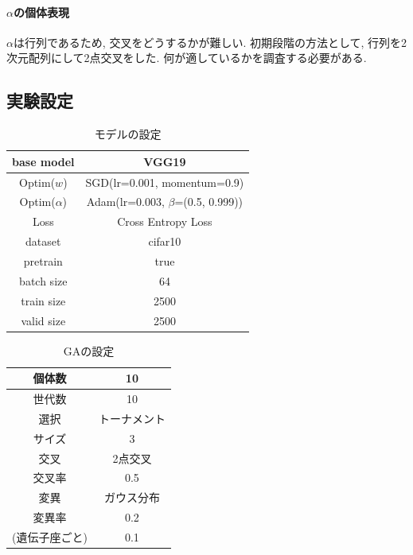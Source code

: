 \documentclass[twocolumn]{jarticle}     %
\begin{document}
\paragraph{$\alpha$の個体表現}
$\alpha$は行列であるため, 交叉をどうするかが難しい.
初期段階の方法として, 行列を2次元配列にして2点交叉をした.
何が適しているかを調査する必要がある.

\subsection{実験設定}

\begin{table}[tb]
  \begin{center}
    \caption{モデルの設定}
    \begin{tabular}{|c|c|} \hline
      base model & VGG19 \\ \hline
      Optim($w$) & SGD(lr=0.001, momentum=0.9) \\ \hline
      Optim($\alpha$) & Adam(lr=0.003, $\beta$=(0.5, 0.999)) \\ \hline
      Loss & Cross Entropy Loss \\ \hline
      dataset & cifar10 \\ \hline
      pretrain & true \\ \hline
      batch size & 64 \\ \hline
      train size & 2500 \\ \hline
      valid size & 2500 \\ \hline
    \end{tabular}
    \label{tab:setting}
  \end{center}
\end{table}

\begin{table}[tb]
  \begin{center}
    \caption{GAの設定}
    \begin{tabular}{|c|c|} \hline
      個体数 & 10 \\ \hline
      世代数 & 10 \\ \hline \hline
      選択 & トーナメント \\ \hline
      サイズ & 3 \\ \hline \hline
      交叉 & 2点交叉 \\ \hline
      交叉率 & 0.5 \\ \hline \hline
      変異 & ガウス分布 \\ \hline
      変異率 & 0.2 \\
      (遺伝子座ごと) & 0.1 \\ \hline
    \end{tabular}
    \label{tab:setting_ga}
  \end{center}
\end{table}
\end{document}

